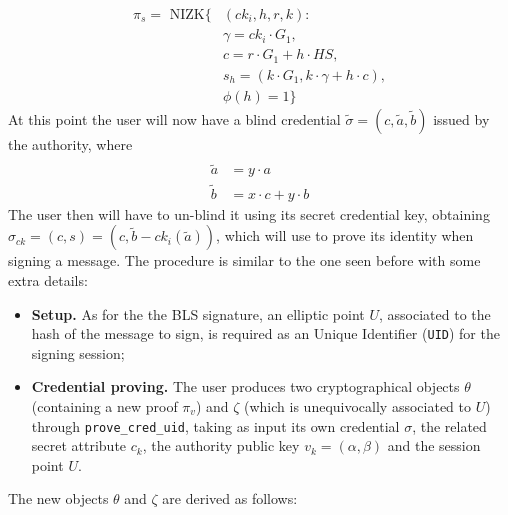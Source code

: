 \documentclass[twocolumn]{article}
\begin{document}
\begin{align*}
\pi_s = \text{ NIZK}\{&(ck_i, h, r, k): \\
&\gamma = ck_i\cdot G_1, \\
&c = r\cdot G_1 + h\cdot HS, \\
&s_h = (k \cdot G_1, k\cdot \gamma + h\cdot c), \\
&\phi(h)=1\}
\end{align*}
At this point the user will now have a blind credential $\tilde{\sigma} = (c, \tilde{a}, \tilde{b})$ issued by the authority, where
\begin{align*} \\
\tilde{a} &= y \cdot a \\
\tilde{b} &= x\cdot c + y\cdot b
\end{align*}
The user then will have to un-blind it using its secret credential key, obtaining $\sigma_{ck} = (c, s) = (c, \tilde{b} - ck_i (\tilde{a}))$, which will use to prove its identity when signing a message. The procedure is similar to the one seen before with some extra details:
\begin{itemize}
    \item \textbf{Setup.} As for the the BLS signature, an elliptic point $U$, associated to the hash of the message to sign, is required as an Unique Identifier (\verb!UID!) for the signing session;
    \item \textbf{Credential proving.} The user produces two cryptographical objects $\theta$ (containing a new proof $\pi_v$) and $\zeta$ (which is unequivocally associated to $U$) through \verb!prove_cred_uid!, taking as input its own credential $\sigma$, the related secret attribute $c_k$, the authority public key $v_k = (\alpha, \beta)$ and the session point $U$.
\end{itemize}
The new objects $\theta$ and $\zeta$ are derived as follows:
\end{document}
